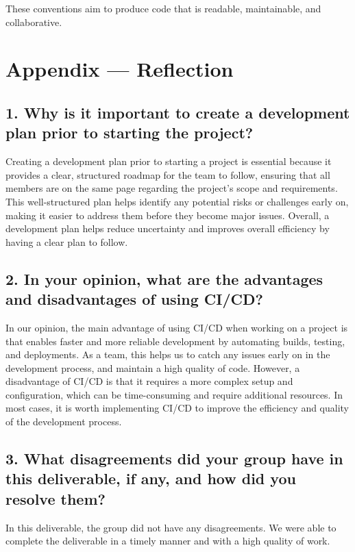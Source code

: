 \documentclass{article}
\begin{document}
These conventions aim to produce code that is readable, maintainable, and
collaborative.

\newpage{}

\section*{Appendix --- Reflection}

\iffalse
\wss{Not required for CAS 741}
\fi


\subsection*{1. Why is it important to create a development plan prior to starting the project?}
Creating a development plan prior to starting a project is essential because it provides a clear, structured roadmap for the team to follow, ensuring that all members are on the same page regarding the project's scope and requirements. This well-structured plan helps identify any potential risks or challenges early on, making it easier to address them before they become major issues. Overall, a development plan helps reduce uncertainty and improves overall efficiency by having a clear plan to follow.

\subsection*{2. In your opinion, what are the advantages and disadvantages of using CI/CD?}
In our opinion, the main advantage of using CI/CD when working on a project is that enables faster and more reliable development by automating builds, testing, and deployments. As a team, this helps us to catch any issues early on in the development process, and maintain a high quality of code. However, a disadvantage of CI/CD is that it requires a more complex setup and configuration, which can be time-consuming and require additional resources. In most cases, it is worth implementing CI/CD to improve the efficiency and quality of the development process.

\subsection*{3. What disagreements did your group have in this deliverable, if any, and how did you resolve them?}
In this deliverable, the group did not have any disagreements. We were able to complete the deliverable in a timely manner and with a high quality of work.
\end{document}
